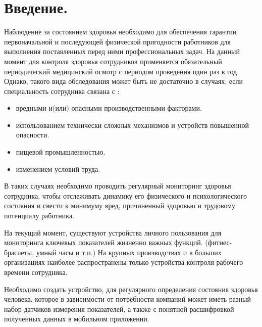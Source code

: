 \documentclass[a4document]{article}
\begin{document}
{
\newpage
\section*{Введение.} 

\par
Наблюдение за состоянием здоровья необходимо для обеспечения гарантии первоначальной и последующей физической пригодности работников для выполнения поставленных перед ними профессиональных задач. На данный момент для контроля здоровья сотрудников применяется обязательный периодический медицинский осмотр с периодом проведения один раз в год. Однако, такого вида обследования может быть не достаточно в случаях, если специальность сотрудника связана с : 

\begin{itemize}
    \item вредными и(или) опасными производственными факторами.
    \item использованием технически сложных механизмов и устройств повышенной опасности.
    \item пищевой промышленностью.
    \item изменением условий труда.
\end{itemize} 

\par\noindent 
В таких случаях необходимо проводить регулярный мониторинг здоровья сотрудника, чтобы отслеживать динамику его физического и психологического состояния и свести к минимуму вред, причиненный здоровью и трудовому потенциалу работника.

\par\noindent
На текущий момент, существуют устройства личного пользования для мониторинга ключевых показателей жизненно важных функций. 
(фитнес-браслеты, умный часы и т.п.) На крупных производствах и в больших организациях наиболее распространены 
только устройства контроля рабочего времени сотрудника.

\par\noindent
Необходимо создать устройство, для регулярного определения состояния здоровья человека, 
которое в зависимости от потребности компаний может иметь разный набор датчиков измерения показателей,
а также с понятной расшифровкой полученных данных в мобильном приложении. 

}
\end{document}
